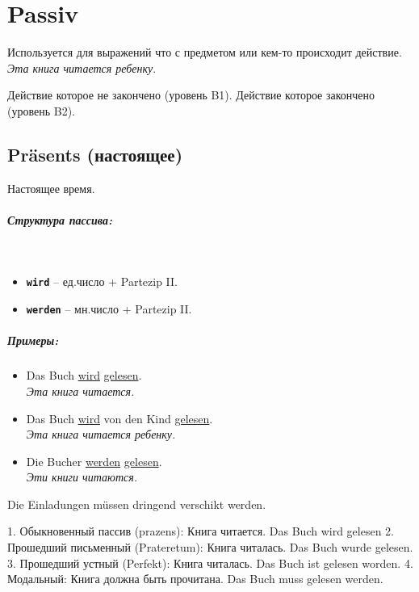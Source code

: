 \documentclass[12pt,a4paper]{report}
\newcommand{\term}[1]{\texttt{\textbf{#1}}}
\newcommand{\satzew}[1]{\underline{#1}}
\newcommand{\ubersatze}[1]{\textit{#1}}
\begin{document}
\chapter{Passiv}

Используется для выражений что с предметом или кем-то происходит действие. \ubersatze{Эта книга читается ребенку}.

Действие которое не закончено (уровень B1).
Действие которое закончено (уровень B2).

\section{Präsents (настоящее)}

Настоящее время.

\paragraph{Структура пассива:} ~\\
\begin{itemize}
\item \term{wird} -- ед.число + Partezip II.
\item \term{werden} -- мн.число + Partezip II.
\end{itemize}

\paragraph{Примеры:}
\begin{itemize}
\item Das Buch \satzew{wird} \satzew{gelesen}.
~\\ \ubersatze{Эта книга читается.}
\item Das Buch \satzew{wird} von den Kind \satzew{gelesen}.
~\\ \ubersatze{Эта книга читается ребенку.}
\item Die Bucher \satzew{werden} \satzew{gelesen}.
~\\ \ubersatze{Эти книги читаются.}
\end{itemize}

Die Einladungen müssen dringend verschikt werden.

1. Обыкновенный пассив (prazens): Книга читается. Das Buch wird gelesen
2. Прошедший письменный (Prateretum): Книга читалась. Das Buch wurde gelesen.
3. Прошедший устный (Perfekt): Книга читалась. Das Buch ist gelesen worden.
4. Модальный: Книга должна быть прочитана. Das Buch muss gelesen werden.
\end{document}
